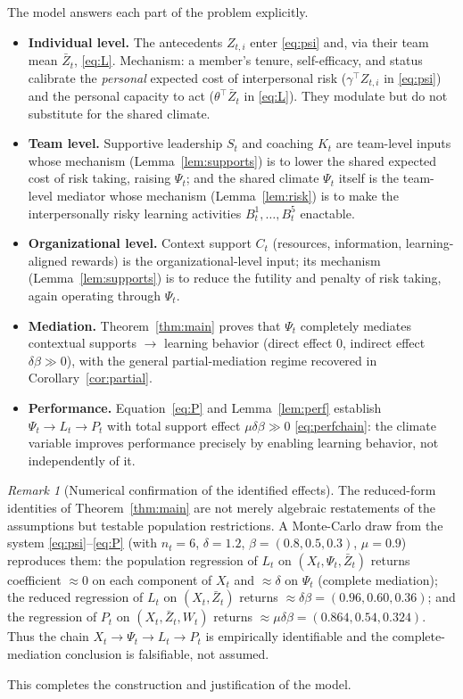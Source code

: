 \documentclass{amsart}
\theoremstyle{definition}
\theoremstyle{remark}
\newtheorem{remark}{Remark}
\begin{document}
The model answers each part of the problem explicitly.

\begin{itemize}
\item \textbf{Individual level.} The antecedents $Z_{t,i}$ enter
\eqref{eq:psi} and, via their team mean $\bar Z_t$, \eqref{eq:L}.
Mechanism: a member's tenure, self-efficacy, and status calibrate the
\emph{personal} expected cost of interpersonal risk
($\gamma^\top Z_{t,i}$ in \eqref{eq:psi}) and the personal capacity to act
($\theta^\top\bar Z_t$ in \eqref{eq:L}). They modulate but do not
substitute for the shared climate.

\item \textbf{Team level.} Supportive leadership $S_t$ and coaching $K_t$
are team-level inputs whose mechanism (Lemma~\ref{lem:supports}) is to
lower the shared expected cost of risk taking, raising $\Psi_t$; and the
shared climate $\Psi_t$ itself is the team-level mediator whose mechanism
(Lemma~\ref{lem:risk}) is to make the interpersonally risky learning
activities $B_t^1,\dots,B_t^5$ enactable.

\item \textbf{Organizational level.} Context support $C_t$
(resources, information, learning-aligned rewards) is the
organizational-level input; its mechanism (Lemma~\ref{lem:supports}) is to
reduce the futility and penalty of risk taking, again operating through
$\Psi_t$.

\item \textbf{Mediation.} Theorem~\ref{thm:main} proves that
$\Psi_t$ completely mediates contextual supports $\to$ learning behavior
(direct effect $0$, indirect effect $\delta\beta\gg0$), with the general
partial-mediation regime recovered in Corollary~\ref{cor:partial}.

\item \textbf{Performance.} Equation~\eqref{eq:P} and
Lemma~\ref{lem:perf} establish $\Psi_t\to L_t\to P_t$ with total support
effect $\mu\delta\beta\gg0$ \eqref{eq:perfchain}: the climate variable
improves performance precisely by enabling learning behavior, not
independently of it.
\end{itemize}

\begin{remark}[Numerical confirmation of the identified effects]
The reduced-form identities of Theorem~\ref{thm:main} are not merely
algebraic restatements of the assumptions but testable population
restrictions. A Monte-Carlo draw from the system
\eqref{eq:psi}--\eqref{eq:P} (with $n_t=6$, $\delta=1.2$,
$\beta=(0.8,0.5,0.3)$, $\mu=0.9$) reproduces them: the population
regression of $L_t$ on $(X_t,\Psi_t,\bar Z_t)$ returns coefficient
$\approx 0$ on each component of $X_t$ and $\approx\delta$ on $\Psi_t$
(complete mediation); the reduced regression of $L_t$ on $(X_t,\bar Z_t)$
returns $\approx\delta\beta=(0.96,0.60,0.36)$; and the regression of $P_t$
on $(X_t,\bar Z_t,W_t)$ returns $\approx\mu\delta\beta=(0.864,0.54,0.324)$.
Thus the chain $X_t\to\Psi_t\to L_t\to P_t$ is empirically identifiable and
the complete-mediation conclusion is falsifiable, not assumed.
\end{remark}

This completes the construction and justification of the model.
\end{document}
